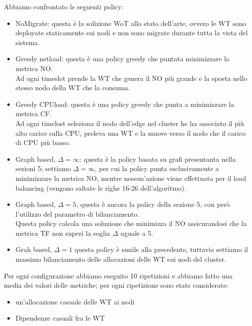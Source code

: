 \documentclass[11pt]{article}
\begin{document}
	Abbiamo confrontato le seguenti policy:
	\begin{itemize}
		\item NoMigrate: questa è la solizione WoT allo stato dell'arte, ovvero le WT sono deployate staticamente sui nodi e non sono migrate durante tutta la vista del sistema.
		\item Greedy netload: questa è una policy greedy che puntata minimizzare la metrica NO. \\
		Ad ogni timeslot prende la WT che genera il NO più grande e la sposta nello stesso nodo della WT che la consuma.
		\item Greedy CPUload: questa è una policy greedy che punta a minimizzare la metrica CF. \\
		Ad ogni timelost seleziona il nodo dell'edge nel cluster he ha associato il più alto carico sulla CPU, preleva una WT e la muove verso il nodo che il carico di CPU più basso.
		\item Graph based, $\Delta = \infty$: questa è la policy basata su grafi presentanta nella sezioni 5; settiamo $\Delta = \infty$, per cui la policy punta esclusivamente a minimizzare la metrica NO, mentre nessun'azione viene effettuata per il load balancing (vengono saltate le righe 16-26 dell'algoritmo).
		\item Graph based, $\Delta = 5$, questa è ancora la policy della sezione 5, con però l'utilizzo del parametro di bilanciamento. \\
		Questa policy calcola una soluzione che minimizza il NO assicurandosi che la metrica TF non superi la soglia $\Delta$ uguale a 5. \\
		\item Grah based, $\Delta = 1$ questa policy  è simile alla precedente, tuttavia settiamo il massimo bilanciamento delle allocazioni delle WT sui nodi del cluster. \\
		
	\end{itemize}


	Per ogni configurazione abbiamo eseguito 10 ripetizioni e abbiamo fatto una media dei valori delle metriche; per ogni ripetizione sono state considerate:
	\begin{itemize}
		\item un'allocazione casuale delle WT ai nodi
		\item Dipendenze casuali fra le WT
	\end{itemize}
\end{document}
